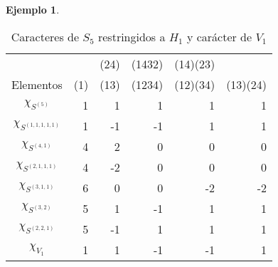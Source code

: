 \documentclass[12pt]{book}
\theoremstyle{definition}
\newtheorem{example}[theorem]{Ejemplo}
\newcounter{in}
\begin{document}
\begin{example}
  \begin{table}[!hbtp]
    \centering
    \begin{small}
      \begin{tabular}{c |r r r r r}
        & & (24) & (1432) & (14)(23) & \\
        Elementos & (1) & (13) & (1234) & (12)(34) & (13)(24) \\
        \hline
        $\chi_{S^{(5)}}$       & 1 & 1 & 1 & 1 & 1 \\
        $\chi_{S^{(1,1,1,1,1)}}$ & 1 & -1 & -1 & 1 & 1 \\
        $\chi_{S^{(4,1)}}$      & 4 & 2 & 0 & 0 & 0 \\
        $\chi_{S^{(2,1,1,1)}}$   & 4 & -2 & 0 & 0 & 0 \\
        $\chi_{S^{(3,1,1)}}$     & 6 & 0 & 0 & -2 & -2 \\
        $\chi_{S^{(3,2)}}$      & 5 & 1 & -1 & 1 & 1 \\
        $\chi_{S^{(2,2,1)}}$    & 5 & -1 & 1 & 1 & 1 \\
        \hline
        $\chi_{V_{1}}$ & 1 & 1 & -1 & -1 & 1 \\
      \end{tabular}

    \end{small}
    \caption{Caracteres de $S_5$ restringidos a $H_{1}$ y carácter de $V_{1}$}
    \label{tab:restriccion-H_1}
  \end{table}


\end{example}
\end{document}
